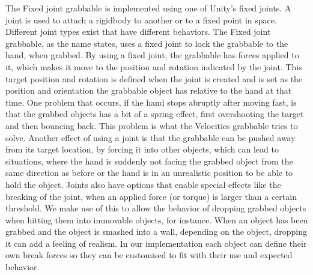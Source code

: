 The Fixed joint grabbable is implemented using one of Unity's fixed joints. A joint is used to attach a rigidbody to another or to a fixed point in space. Different joint types exist that have different behaviors. The Fixed joint grabbable, as the name states, uses a fixed joint to lock the grabbable to the hand, when grabbed. By using a fixed joint, the grabbable has forces applied to it, which makes it move to the position and rotation indicated by the joint. This target position and rotation is defined when the joint is created and is set as the position and orientation the grabbable object has relative to the hand at that time. One problem that occurs, if the hand stops abruptly after moving fast, is that the grabbed objects has a bit of a spring effect, first overshooting the target and then bouncing back. This problem is what the Velocities grabbable tries to solve. Another effect of using a joint is that the grabbable can be pushed away from its target location, by forcing it into other objects, which can lead to situations, where the hand is suddenly not facing the grabbed object from the same direction as before or the hand is in an unrealistic position to be able to hold the object.  Joints also have options that enable special effects like the breaking of the joint, when an applied force (or torque) is larger than a certain threshold. We make use of this to allow the behavior of dropping grabbed objects when hitting them into immovable objects, for instance. When an object has been grabbed and the object is smashed into a wall, depending on the object, dropping it can add a feeling of realism. In our implementation each object can define their own break forces so they can be customised to fit with their use and expected behavior.

